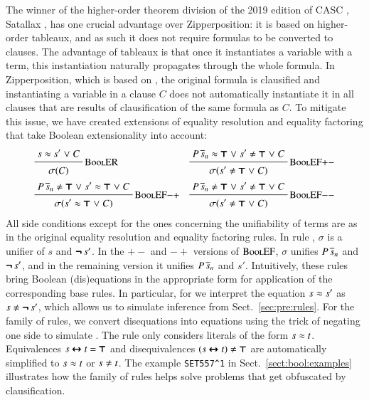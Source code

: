 The winner of the higher-order theorem division of the 2019 edition of CASC \cite{gs-19-casc27}, Satallax \cite{cb-12-satallax}, has one
crucial advantage over Zipperposition: it is based on higher-order
tableaux, and as such it does not require formulas to be converted to clauses. The advantage of tableaux is that once it instantiates a variable with a
term, this instantiation naturally propagates through the whole formula. In
Zipperposition, which is based on \lsup{}, the original formula
is clausified and instantiating a variable in a clause $C$ does not automatically instantiate
it in all clauses that are results of clausification of the same formula as $C$.
To mitigate this issue, we have created extensions of equality resolution and equality factoring
that take Boolean extensionality into account:
%
\begin{align*}
  & \namedinference{BoolER}
  { s \eq s' \llor C}
  {\sigmacl{C}}
  &&
  \namedinference{BoolEF$+-$}
  {P\,\tuplen{s} \eq \itrue \llor s' \not\eq \itrue \llor C}
  {\sigmacl{s' \not\eq \itrue \llor C}} \\
  & \namedinference{BoolEF$-+$}
  {P\,\tuplen{s} \not\eq \itrue \llor s' \eq \itrue \llor C}
  {\sigmacl{s' \eq \itrue \llor C}} &&
  \namedinference{BoolEF$-$$-$}
  {P\,\tuplen{s} \not\eq \itrue \llor s' \not\eq \itrue \llor C}
  {\sigmacl{s' \not\eq \itrue \llor C}}
\end{align*}
%
All side conditions except for the ones concerning the unifiability of terms are
as in the original equality resolution and equality factoring rules. In rule
, $\sigma$ is a unifier of $ s $ and $ \pmb{\neg\,} s' $. In the $+-$
and $-+$ versions of $\textsc{BoolEF}$, $\sigma$ unifies $ P \, \overline{s}_{n}
$ and $\pmb{\neg\,} s'$, and in the remaining version it unifies $ P \, \overline{s}_{n} $ and
$s'$. Intuitively, these rules bring Boolean (dis)equations in the appropriate
form for application of the corresponding base rules. In particular,
for  we interpret the equation $s \approx s'$ as $s \not\eq \inot s'$, which
allows us to simulate  inference from Sect.~\ref{sec:pre:rules}. 
For the  family of rules, we convert disequations into equations
using the trick of negating one side to simulate .
The rule  only considers literals of the form $s \approx t$. 
Equivalences $s \pmb{\leftrightarrow} t = \pmb{\top}$ and disequivalences $(s \iequiv t) \not\eq \itrue$ are automatically simplified to $s \approx t$ or $s \not\eq t$.
The example  \verb|SET557^1| in Sect.~\ref{sect:bool:examples} illustrates how 
the  family of rules helps solve problems that get obfuscated by clausification.

